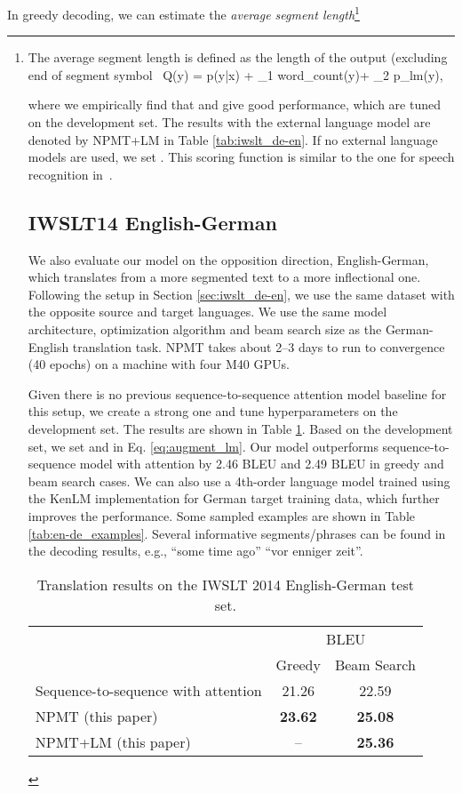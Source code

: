 \documentclass{article}
\begin{document}
In greedy decoding, we can estimate the {\it average segment
length}\footnote{The average segment length is defined as the length of the
output (excluding end of segment symbol \
 Q(y) = \log p(y|x)  + \lambda_1 {\rm
  word\_count}(y)+ \lambda_2 \log p_{\rm lm}(y), 
\label{eq:augment_lm}

where we empirically find that  and  give good
performance, which are tuned on the development set. The results with the external language model are denoted by NPMT+LM in Table \ref{tab:iwslt_de-en}. If no external language
models are used, we set . This scoring function is similar to the
one for speech recognition in~\citet{hannun2014deep}. 





\subsection{IWSLT14 English-German}
\label{sec:iwslt_en-de}
We also evaluate our model on the opposition direction, English-German, which
translates from a more segmented text to a more inflectional one.  Following the
setup in Section \ref{sec:iwslt_de-en}, we use the same dataset with the
opposite source and target languages.  We use the same model architecture,
optimization algorithm and beam search size as the German-English translation
task. NPMT takes about 2--3 days to run to convergence (40 epochs) on a machine with four M40 GPUs.

Given there is no previous sequence-to-sequence attention model baseline for
this setup, we create a strong one and tune hyperparameters on the development
set.  The results are shown in Table \ref{tab:iwslt_en-de}. Based on the
development set, we set  and  in Eq.
\eqref{eq:augment_lm}.  Our model outperforms sequence-to-sequence model with
attention by 2.46 BLEU and 2.49 BLEU in greedy and beam search cases.  We can
also use a 4th-order language model trained using the KenLM
implementation for German target training data, which
further improves the performance.  Some sampled examples are shown in
Table \ref{tab:en-de_examples}.  Several informative segments/phrases can be
found in the decoding results, e.g., ``some time ago''  ``vor
enniger zeit''.

\begin{table}[h]
	\centering
	\begin{tabular}{lcc}
		\toprule		
		& \multicolumn{2}{c}{BLEU } \\ 
		&  Greedy & Beam Search \\ 	
		\midrule
Sequence-to-sequence with attention \cite{} & 21.26  & 22.59 \\
		NPMT (this paper) & \textbf{23.62} & \textbf{25.08} \\	
	    NPMT+LM (this paper) & {--} & \textbf{25.36} \\									
		\bottomrule
	\end{tabular}
	\caption{\small{Translation results on the IWSLT 2014 English-German
		test set.}}
\label{tab:iwslt_en-de}
\end{table}



}
\end{document}
